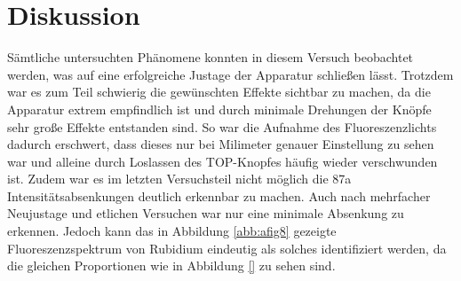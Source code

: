 \section{Diskussion}
\label{sec:Diskussion}

Sämtliche untersuchten Phänomene konnten in diesem Versuch beobachtet werden, was auf eine erfolgreiche Justage der Apparatur schließen lässt.
Trotzdem war es zum Teil schwierig die gewünschten Effekte sichtbar zu machen, da die Apparatur extrem empfindlich ist und durch minimale Drehungen der Knöpfe sehr große Effekte entstanden sind.
So war die Aufnahme des Fluoreszenzlichts dadurch erschwert, dass dieses nur bei Milimeter genauer Einstellung zu sehen war und alleine durch Loslassen des TOP-Knopfes häufig wieder verschwunden ist.
Zudem war es im letzten Versuchsteil nicht möglich die 87a Intensitätsabsenkungen deutlich erkennbar zu machen.
Auch nach mehrfacher Neujustage und etlichen Versuchen war nur eine minimale Absenkung zu erkennen.
Jedoch kann das in Abbildung \ref{abb:afig8} gezeigte Fluoreszenzspektrum von Rubidium eindeutig als solches identifiziert werden, da die gleichen Proportionen wie in Abbildung \ref{} zu sehen sind.